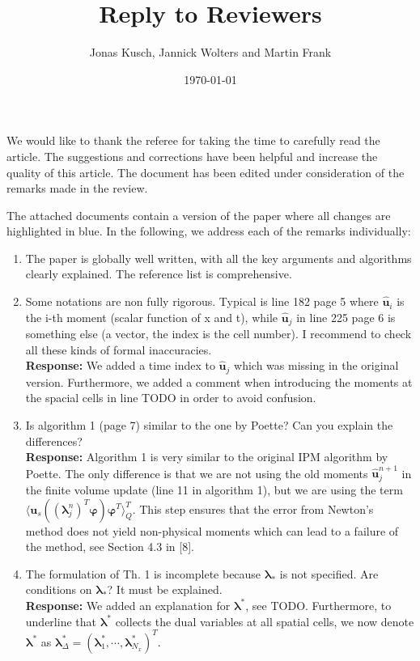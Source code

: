 \documentclass[11pt]{amsart}
\title{Reply to Reviewers}
\author{Jonas Kusch, Jannick Wolters and Martin Frank}
\date{\today}                                           %
\begin{document}
\maketitle

We would like to thank the referee for taking the time to carefully read the article. The suggestions and corrections have been helpful and increase the quality of this article. The document has been edited under consideration of the remarks made in the review.

\vspace{1em}

The attached documents contain a version of the paper where all changes are highlighted in blue. In the following, we address each of the remarks individually:

\begin{enumerate}
\item The paper is globally well written, with all the key arguments and algorithms clearly explained. The reference list is comprehensive.
\item Some notations are non fully rigorous. Typical is line 182 page 5 where $\bm{\hat u}_i$
is the i-th moment (scalar function of x and t), while $\bm{\hat u}_j$ in line 225 page
6 is something else (a vector, the index is the cell number). I recommend
to check all these kinds of formal inaccuracies.
\\ \textbf{Response:} We added a time index to $\bm{\hat u}_j$ which was missing in the original version. Furthermore, we added a comment when introducing the moments at the spacial cells in line TODO in order to avoid confusion.
\item Is algorithm 1 (page 7) similar to the one by Poette? Can you explain the differences?
\\ \textbf{Response:} Algorithm 1 is very similar to the original IPM algorithm by Poette. The only difference is that we are not using the old moments $\bm{\hat u}_j^{n+1}$ in the finite volume update (line 11 in algorithm 1), but we are using the term $\langle \bm u_{s}((\bm{\lambda}_j^n)^T\bm{\varphi})\bm{\varphi}^T\rangle_Q^T$. This step ensures that the error from Newton's method does not yield non-physical moments which can lead to a failure of the method, see Section 4.3 in [8].
\item The formulation of Th. 1 is incomplete because $\bm\lambda_*$ is not specified. Are
conditions on $\bm\lambda_*$? It must be explained.
\\ \textbf{Response:} We added an explanation for $\bm\lambda^*$, see TODO. Furthermore, to underline that $\bm\lambda^*$ collects the dual variables at all spatial cells, we now denote $\bm\lambda^*$ as $\bm{\lambda}_{\Delta}^*=(\bm{\lambda}_{1}^*,\cdots,\bm{\lambda}_{N_x}^*)^T$.

\end{enumerate}
\end{document}
